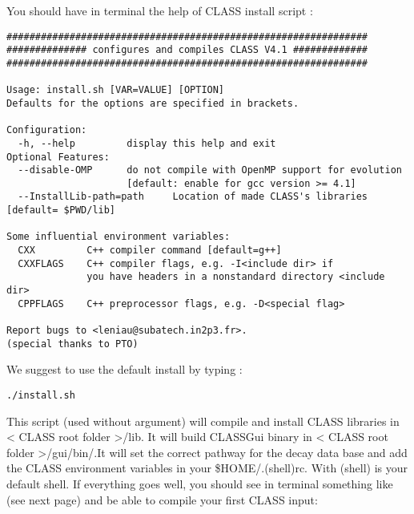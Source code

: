 You should have in terminal the help of CLASS install script :
\begin{center}
\begin{minipage}{\textwidth}
\begin{lstlisting}[style=terminal]
###############################################################
############## configures and compiles CLASS V4.1 #############
###############################################################

Usage: install.sh [VAR=VALUE] [OPTION]
Defaults for the options are specified in brackets.

Configuration:
  -h, --help         display this help and exit
Optional Features:
  --disable-OMP      do not compile with OpenMP support for evolution 
                     [default: enable for gcc version >= 4.1]
  --InstallLib-path=path     Location of made CLASS's libraries [default= $PWD/lib]

Some influential environment variables:
  CXX         C++ compiler command [default=g++]
  CXXFLAGS    C++ compiler flags, e.g. -I<include dir> if
              you have headers in a nonstandard directory <include dir>
  CPPFLAGS    C++ preprocessor flags, e.g. -D<special flag>

Report bugs to <leniau@subatech.in2p3.fr>.
(special thanks to PTO)
\end{lstlisting}
\end{minipage}
\end{center}
We suggest to use the default install by typing :
\begin{center}
\begin{minipage}{\textwidth}
\begin{lstlisting}[style=terminal]
./install.sh
\end{lstlisting}
\end{minipage}
\end{center}
This script (used without argument) will compile and install CLASS libraries in < CLASS root folder >/lib.
It will build CLASSGui binary in < CLASS root folder >/gui/bin/.It will set the correct pathway for the decay data base and add the CLASS environment variables in your \$HOME/.(shell)rc. With (shell) is your default shell. If everything goes well, you should see in terminal something like (see next page) and be able to compile your first CLASS input:

